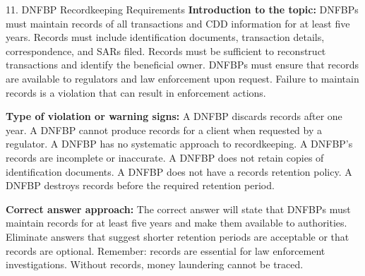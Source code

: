 \documentclass[11pt,a4paper]{beamer}
\begin{document}
\begin{frame}{11. DNFBP Recordkeeping Requirements}
\tiny
\noindent\textbf{Introduction to the topic:} DNFBPs must maintain records of all transactions and CDD information for at least five years. Records must include identification documents, transaction details, correspondence, and SARs filed. Records must be sufficient to reconstruct transactions and identify the beneficial owner. DNFBPs must ensure that records are available to regulators and law enforcement upon request. Failure to maintain records is a violation that can result in enforcement actions.

\vspace{0.1cm}
\noindent\textbf{Type of violation or warning signs:} A DNFBP discards records after one year. A DNFBP cannot produce records for a client when requested by a regulator. A DNFBP has no systematic approach to recordkeeping. A DNFBP's records are incomplete or inaccurate. A DNFBP does not retain copies of identification documents. A DNFBP does not have a records retention policy. A DNFBP destroys records before the required retention period.

\vspace{0.1cm}
\noindent\textbf{Correct answer approach:} The correct answer will state that DNFBPs must maintain records for at least five years and make them available to authorities. Eliminate answers that suggest shorter retention periods are acceptable or that records are optional. Remember: records are essential for law enforcement investigations. Without records, money laundering cannot be traced.
\end{frame}
\end{document}

